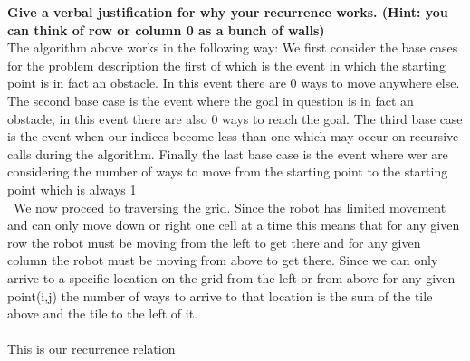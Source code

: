 \documentclass[11pt]{article}
\theoremstyle{definition}  %
\begin{document}
\textbf{Give a verbal justification for why your recurrence works. (Hint: you can think of row or column 0 as a bunch of walls)}\\
The algorithm above works in the following way: We first consider the base cases for the problem description the first of which is the event in which the starting point is in fact an obstacle. In this event there are 0 ways to move anywhere else. The second base case is the event where the goal in question is in fact an obstacle, in this event there are also 0 ways to reach the goal. The third base case is the event when our indices become less than one  which may occur on recursive calls during the algorithm. Finally the last base case is the event where wer are considering the number of ways to move from the starting point to the starting point which is always 1 \\\
We now proceed to traversing the grid. Since the robot has limited movement and can only move down or right one cell at a time this means that for any given row the robot must be moving from the left to get there and for any given column the robot must be moving from above to get there. Since we can only arrive to a specific location on the grid from the left or from above for any given point(i,j) the number of ways to arrive to that location is the sum of the tile above and the tile to the left of it.\\\\
This is our recurrence relation
\end{document}
